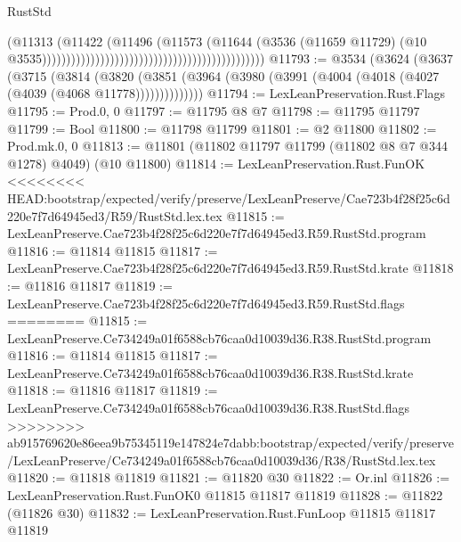 \begin{lexlean}{RustStd}
\begin{coremodule}
{\begin{coremodule}
{{{{{{{{{{{{{{{{{{{{{{{{{{{{{{{{{{{{{{{{{{{{{{{{{{                                                                                  (@11313
                                                                                    (@11422
                                                                                      (@11496
                                                                                        (@11573
                                                                                          (@11644
                                                                                            (@3536
                                                                                              (@11659
                                                                                                @11729)
                                                                                              (@10
                                                                                                @3535))))))))))))))))))))))))))))))))))))))))))))))
@11793 := @3534
    (@3624
      (@3637
        (@3715
          (@3814
            (@3820
              (@3851 (@3964 (@3980 (@3991 (@4004 (@4018 (@4027 (@4039 (@4068 @11778))))))))))))))
@11794 := LexLeanPreservation.Rust.Flags
@11795 := Prod.{0, 0}
@11797 := @11795 @8 @7
@11798 := @11795 @11797
@11799 := Bool
@11800 := @11798 @11799
@11801 := @2 @11800
@11802 := Prod.mk.{0, 0}
@11813 := @11801 (@11802 @11797 @11799 (@11802 @8 @7 @344 @1278) @4049) (@10 @11800)
@11814 := LexLeanPreservation.Rust.FunOK
<<<<<<<< HEAD:bootstrap/expected/verify/preserve/LexLeanPreserve/Cae723b4f28f25c6d220e7f7d64945ed3/R59/RustStd.lex.tex
@11815 := LexLeanPreserve.Cae723b4f28f25c6d220e7f7d64945ed3.R59.RustStd.program
@11816 := @11814 @11815
@11817 := LexLeanPreserve.Cae723b4f28f25c6d220e7f7d64945ed3.R59.RustStd.krate
@11818 := @11816 @11817
@11819 := LexLeanPreserve.Cae723b4f28f25c6d220e7f7d64945ed3.R59.RustStd.flags
========
@11815 := LexLeanPreserve.Ce734249a01f6588cb76caa0d10039d36.R38.RustStd.program
@11816 := @11814 @11815
@11817 := LexLeanPreserve.Ce734249a01f6588cb76caa0d10039d36.R38.RustStd.krate
@11818 := @11816 @11817
@11819 := LexLeanPreserve.Ce734249a01f6588cb76caa0d10039d36.R38.RustStd.flags
>>>>>>>> ab915769620e86eea9b75345119e147824e7dabb:bootstrap/expected/verify/preserve/LexLeanPreserve/Ce734249a01f6588cb76caa0d10039d36/R38/RustStd.lex.tex
@11820 := @11818 @11819
@11821 := @11820 @30
@11822 := Or.inl
@11826 := LexLeanPreservation.Rust.FunOK0 @11815 @11817 @11819
@11828 := @11822 (@11826 @30)
@11832 := LexLeanPreservation.Rust.FunLoop @11815 @11817 @11819
}}}}}}}}}}}}}}}}}}}}}}}}}}}}}}}}}}}}}}}}}}}}}}}}}}
\end{coremodule}}
\end{coremodule}
\end{lexlean}
